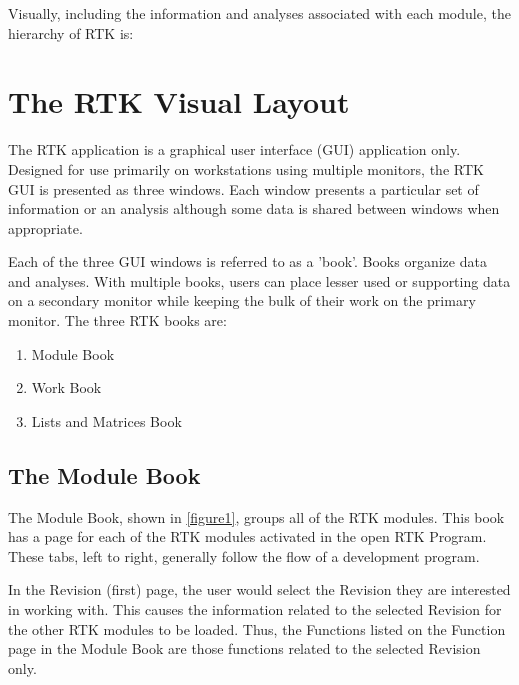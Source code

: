 \documentclass[twoside,12pt,letterpaper,openright]{book}
\begin{document}
\noindent Visually, including the information and analyses associated with each
module, the hierarchy of RTK is:
\\


\section{The RTK Visual Layout}

\noindent The RTK application is a graphical user interface (GUI) application
only.  Designed for use primarily on workstations using multiple monitors, the
RTK GUI is presented as three windows.  Each window presents a particular set
of information or an analysis although some data is shared between windows when
appropriate.

\noindent Each of the three GUI windows is referred to as a 'book'.  Books 
organize data and analyses.  With multiple books, users can place lesser used
or supporting data on a secondary monitor while keeping the bulk of their work
on the primary monitor.  The three RTK books are:

\begin{enumerate}
    \item Module Book
    \item Work Book
    \item Lists and Matrices Book
\end{enumerate}

\subsection{The Module Book}

\noindent The Module Book, shown in \ref{figure1}, groups all of the RTK 
modules.  This book has a page for each of the RTK modules activated in the 
open RTK Program.  These tabs, left to right, generally follow the flow of a 
development program.

\noindent In the Revision (first) page, the user would select the Revision
they are interested in working with.  This causes the information related to
the selected Revision for the other RTK modules to be loaded.  Thus, the 
Functions listed on the Function page in the Module Book are those functions
related to the selected Revision only.
\end{document}
